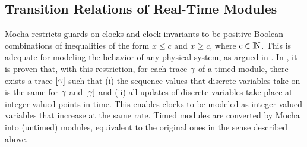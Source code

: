 \subsection{Transition Relations of Real-Time Modules}

{\sc Mocha} restricts guards on clocks and clock invariants to be
positive Boolean combinations of inequalities of the form $x \le c$
and $x \ge c$, where $c \in {\rm I\!N}$. This is adequate for modeling the
behavior of any physical system, as argued in \cite{serdar-cav-submit}. In
\cite{digital-clocks}, it is proven that, with this restriction, for
each trace $\gamma$ of a timed module, there exists a trace
$[\gamma]$ such that (i) the sequence values that discrete variables
take on is the same for $\gamma$ and $[\gamma]$ and (ii) all updates
of discrete variables take place at integer-valued points in
time. This enables clocks to be modeled as integer-valued variables
that increase at the same rate. Timed modules are converted by {\sc
Mocha} into (untimed) modules, equivalent to the original ones in the
sense described above.




